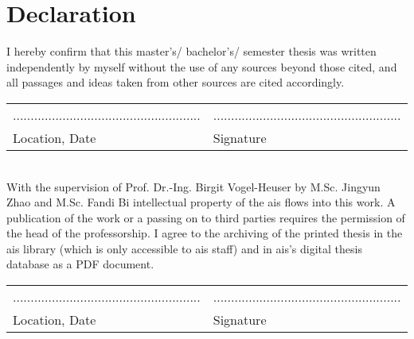 \chapter*{Declaration}
I hereby confirm that this master's/ bachelor's/ semester thesis was written independently by myself without the use of any sources beyond those cited, and all passages and ideas taken from other sources are cited accordingly.%
%
\vspace{5cm}\\
\begin{tabular}{p{0.5\linewidth}p{0.5\linewidth} }
	.....................................................		& .....................................................\\
	Location, Date  	& Signature
\end{tabular}
%
\vspace{2cm}\\
%
With the supervision of Prof. Dr.-Ing. Birgit Vogel-Heuser by M.Sc. Jingyun Zhao
and M.Sc. Fandi Bi intellectual property of the \gls{ais} flows into this work. A publication of the work or a passing on to third parties requires the permission of the head of the professorship. I agree to the archiving of the printed thesis in the  \gls{ais} library (which is only accessible to \gls{ais} staff) and in \gls{ais}'s digital thesis database as a PDF document.%
%
\vfill
%
\begin{tabular}{p{0.5\linewidth}p{0.5\linewidth} }
	.....................................................		& .....................................................\\
    Location, Date  	& Signature
\end{tabular}
